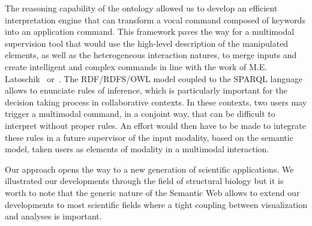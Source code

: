 \documentclass{vgtc}                          %
\begin{document}
The reasoning capability of the ontology allowed us to develop an efficient interpretation engine that can transform a vocal command composed of keywords into an application command. This framework paves the way for a multimodal supervision tool that would use the high-level description of the manipulated elements, as well as the heterogeneous interaction natures, to merge inputs and create intelligent and complex commands in line with the work of M.E. Latoschik~\cite{Wiebusch:2015aa} or~\cite{gutierrez2005semantics}.
The RDF/RDFS/OWL model coupled to the SPARQL language allows to enunciate rules of inference, which is particularly important for the decision taking process in collaborative contexts. In these contexts, two users may trigger a multimodal command, in a conjoint way, that can be difficult to interpret without proper rules. An effort would then have to be made to integrate these rules in a future supervisor of the input modality, based on the semantic model, taken users as elements of modality in a multimodal interaction.

Our approach opens the way to a new generation of scientific applications. We illustrated our developments through the field of structural biology but it is worth to note that the generic nature of the Semantic Web allows to extend our developments to most scientific fields where a tight coupling between visualization and analyses is important. 








\end{document}
